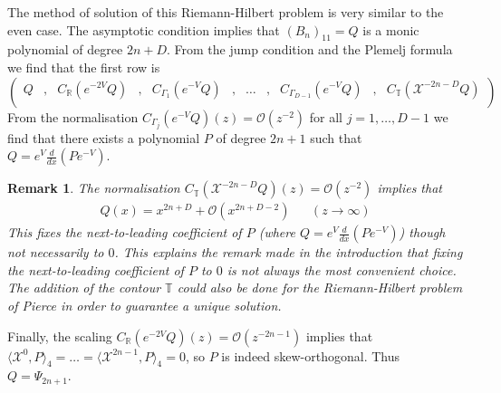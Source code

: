 \documentclass[12pt]{article}
\newtheorem{remark}[theorem]{Remark}
\theoremstyle{definition}
\begin{document}
The method of solution of this Riemann-Hilbert problem is very similar to the even case.  The asymptotic condition implies that $(B_{n})_{11} = Q$ is a monic polynomial of degree $2n+D$. From the jump condition and the Plemelj formula we find that the first row is
$$\left(\begin{array}{ccccccccccccc} Q &  ,  &  C_{\mathbb{R}}(e^{-2V} Q) & , & C_{\Gamma_1}(e^{-V}  Q) & , & \dots & , & C_{\Gamma_{D-1}}(e^{-V}  Q) & , & C_{\mathbb{T}}( \mathscr{X}^{-2n-D}  Q) \\
\end{array}\right)
 $$
From the normalisation $C_{\Gamma_{j}}(e^{-V} Q)(z) = \mathcal{O}(z^{-2})$ for all $j=1, \dots, D-1$ we find that there exists a polynomial $P$ of degree $2n+1$ such that $Q = e^V \frac{d}{dx}( P e^{-V})$. 
\begin{remark} The normalisation $C_{\mathbb{T}}( \mathscr{X}^{-2n-D} Q)(z) = \mathcal{O}(z^{-2})$ implies that
\begin{align*}
Q(x) = x^{2n+D} + \mathcal{O}(x^{2n+D-2}) & & (z \to \infty) 
\end{align*}
This fixes the next-to-leading coefficient of $P$ (where $Q = e^V \frac{d}{dx}\left( P e^{-V} \right)$) though not necessarily to $0$. This explains the remark made in the introduction that fixing the next-to-leading coefficient of $P$ to $0$ is not always the most convenient choice. The addition of the contour $\mathbb{T}$ could also be done for the Riemann-Hilbert problem of Pierce \cite{PIERCE2008230} in order to guarantee a unique solution.
\end{remark}

Finally, the scaling $C_{\mathbb{R}}(e^{-2V}  Q)(z) = \mathcal{O}(z^{-2n-1})$ implies that $\langle \mathscr{X}^{0}, P \rangle_4 = \dots = \langle \mathscr{X}^{2n-1}, P \rangle_4 = 0$, so $P$ is indeed skew-orthogonal. Thus $Q = \Psi_{2n+1}$.
\end{document}
